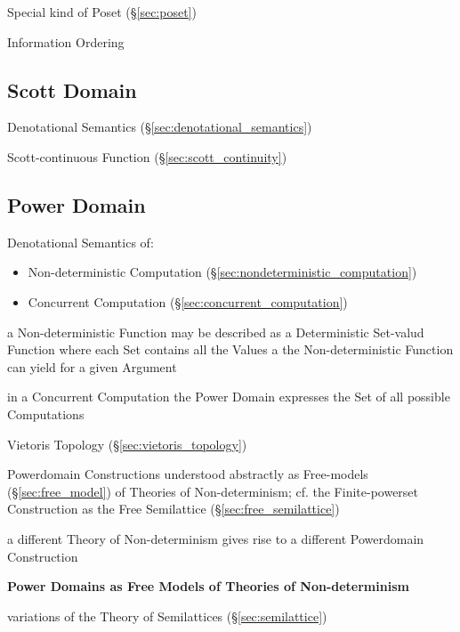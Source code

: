 Special kind of Poset (\S\ref{sec:poset})

Information Ordering



\subsection{Scott Domain}\label{sec:scott_domain}

Denotational Semantics (\S\ref{sec:denotational_semantics})

Scott-continuous Function (\S\ref{sec:scott_continuity})



\subsection{Power Domain}\label{sec:power_domain}

Denotational Semantics of:
\begin{itemize}
  \item Non-deterministic Computation
    (\S\ref{sec:nondeterministic_computation})
  \item Concurrent Computation (\S\ref{sec:concurrent_computation})
\end{itemize}

a Non-deterministic Function may be described as a Deterministic
Set-valud Function where each Set contains all the Values a the
Non-deterministic Function can yield for a given Argument

in a Concurrent Computation the Power Domain expresses the Set of all
possible Computations

\fist Vietoris Topology (\S\ref{sec:vietoris_topology})

Powerdomain Constructions understood abstractly as Free-models
(\S\ref{sec:free_model}) of Theories of Non-determinism; cf. the
Finite-powerset Construction as the Free Semilattice
(\S\ref{sec:free_semilattice})

a different Theory of Non-determinism gives rise to a different
Powerdomain Construction


\textbf{Power Domains as Free Models of Theories of Non-determinism}

variations of the Theory of Semilattices (\S\ref{sec:semilattice})


